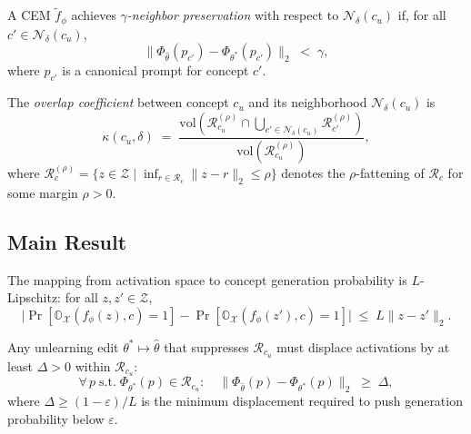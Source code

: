 \begin{definition}
\label{def:neighbor}
A CEM $\tilde{f}_\phi$ achieves \emph{$\gamma$-neighbor preservation}
with respect to $\mathcal{N}_\delta(c_u)$ if, for all
$c' \in \mathcal{N}_\delta(c_u)$,
\[
    \bigl\|\Phi_{\hat\theta}(p_{c'}) - \Phi_{\theta^*}(p_{c'})
    \bigr\|_2 \;<\; \gamma,
\]
where $p_{c'}$ is a canonical prompt for concept $c'$.
\end{definition}

\begin{definition}
The \emph{overlap coefficient} between concept $c_u$ and its
neighborhood $\mathcal{N}_\delta(c_u)$ is
\[
    \kappa(c_u, \delta) \;=\;
    \frac{
        \mathrm{vol}\!\left(
            \mathcal{R}_{c_u}^{(\rho)} \cap
            \bigcup_{c' \in \mathcal{N}_\delta(c_u)}
            \mathcal{R}_{c'}^{(\rho)}
        \right)
    }{
        \mathrm{vol}\!\left(\mathcal{R}_{c_u}^{(\rho)}\right)
    },
\]
where $\mathcal{R}_c^{(\rho)} = \{z \in \mathcal{Z} \mid
\inf_{r \in \mathcal{R}_c}\|z - r\|_2 \leq \rho\}$ denotes the
$\rho$-fattening of $\mathcal{R}_c$ for some margin $\rho > 0$.
\end{definition}

\subsection{Main Result}

\begin{assumption}
\label{asm:lip}
The mapping from activation space to concept generation probability
is $L$-Lipschitz: for all $z, z' \in \mathcal{Z}$,
\[
    \bigl|\Pr[\mathbb{O}_\mathcal{X}(f_\phi(z),c)=1]
    - \Pr[\mathbb{O}_\mathcal{X}(f_\phi(z'),c)=1]\bigr|
    \;\leq\; L\|z - z'\|_2.
\]
\end{assumption}

\begin{assumption}
\label{asm:edit}
Any unlearning edit $\theta^* \mapsto \hat\theta$ that suppresses
$\mathcal{R}_{c_u}$ must displace activations by at least
$\Delta > 0$ within $\mathcal{R}_{c_u}$:
\[
    \forall\, p \;\text{s.t.}\;
    \Phi_{\theta^*}(p) \in \mathcal{R}_{c_u}:
    \quad
    \bigl\|\Phi_{\hat\theta}(p) - \Phi_{\theta^*}(p)\bigr\|_2
    \;\geq\; \Delta,
\]
where $\Delta \geq (1 - \varepsilon)/L$ is the minimum displacement
required to push generation probability below $\varepsilon$.
\end{assumption}

